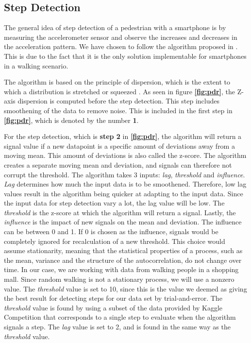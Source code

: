 
\subsection{Step Detection}

The general idea of step detection of a pedestrian with a smartphone is by measuring the accelerometer sensor and observe the increases and decreases in the acceleration pattern\cite{HybridPositioningPaper}. We have chosen to follow the algorithm proposed in \cite{peakdetection}. This is due to the fact that it is the only solution implementable for smartphones in a walking scenario.

The algorithm is based on the principle of dispersion, which is the extent to which a distribution is stretched or squeezed \cite{dispersion}. As seen in figure \textbf{\autoref{fig:pdr}}, the Z-axis dispersion is computed before the step detection. This step includes smoothening of the data to remove noise. This is included in the first step in \textbf{\autoref{fig:pdr}}, which is denoted by the number \textbf{1}.

For the step detection, which is \textbf{step 2} in \textbf{\autoref{fig:pdr}}, the algorithm will return a signal value if a new datapoint is a specific amount of deviations away from a moving mean. This amount of deviations is also called the z-score. The algorithm creates a separate moving mean and deviation, and signals can therefore not corrupt the threshold. The algorithm takes 3 inputs: \textit{lag}, \textit{threshold} and \textit{influence}. \textit{Lag} determines how much the input data is to be smoothened. Therefore, low lag values result in the algorithm being quicker at adapting to the input data. Since the input data for step detection vary a lot, the lag value will be low. The \textit{threshold} is the z-score at which the algorithm will return a signal. Lastly, the \textit{influence} is the impact of new signals on the mean and deviation. The influence can be between 0 and 1. If 0 is chosen as the influence, signals would be completely ignored for recalculation of a new threshold. This choice would assume stationarity, meaning that the statistical properties of a process, such as the mean, variance and the structure of the autocorrelation, do not change over time\cite{stationarity}. In our case, we are working with data from walking people in a shopping mall. Since random walking is not a stationary process, we will use a nonzero value\cite{peakdetection}. The \textit{threshold} value is set to 10, since this is the value we deemed as giving the best result for detecting steps for our data set by trial-and-error. The \textit{threshold} value is found by using a subset of the data provided by Kaggle Competition that corresponds to a single step to evaluate when the algorithm signals a step. The \textit{lag} value is set to 2, and is found in the same way as the \textit{threshold} value.


